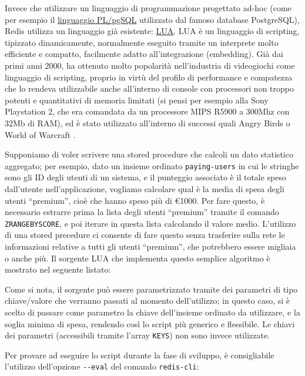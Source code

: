 Invece che utilizzare un linguaggio di programmazione progettato ad-hoc (come per esempio il
\href{https://www.postgresql.org/docs/9.6/static/plpgsql.html}{linguaggio PL/pgSQL} utilizzato dal
famoso database PostgreSQL), Redis utilizza un linguaggio già esistente:
\href{https://www.lua.org}{LUA}. LUA è un linguaggio di scripting, tipizzato dinamicamente,
normalmente eseguito tramite un interprete molto efficiente e compatto, facilmente adatto
all'integrazione (embedding). Già dai primi anni 2000, ha ottenuto molto popolarità nell'industria
di videogiochi come linguaggio di scripting, proprio in virtù del profilo di performance e
compatezza che lo rendeva utilizzabile anche all'interno di console con processori non troppo
potenti e quantitativi di memoria limitati (si pensi per esempio alla Sony Playstation 2, che era
comandata da un processore MIPS R5900 a 300Mhz con 32Mb di RAM), ed è stato utilizzato all'interno
di successi quali Angry Birds \cite{lua-angry} o World of Warcraft \cite{lua-wow}.

Supponiamo di voler scrivere una stored procedure che calcoli un dato statistico aggregato; per
esempio, dato un insieme ordinato \verb|paying-users| in cui le stringhe sono gli ID degli utenti
di un sistema, e il punteggio associato è il totale speso dall'utente nell'applicazione, vogliamo
calcolare qual è la media di spesa degli utenti ``premium'', cioè che hanno speso più di €1000. 
Per fare questo, è necessario estrarre prima la lista degli utenti ``premium'' tramite il comando
\verb|ZRANGEBYSCORE|, e poi iterare in questa lista calcolando il valore medio. L'utilizzo di una
stored precedure ci consente di fare questo senza trasferire sulla rete le informazioni relative
a tutti gli utenti ``premium'', che potrebbero essere migliaia o anche più. Il sorgente LUA che
implementa questo semplice algoritmo è mostrato nel seguente listato:

\medskip


Come si nota, il sorgente può essere parametrizzato tramite dei parametri di tipo chiave/valore
che verranno passati al momento dell'utilizzo; in questo caso, si è scelto di passare come parametro 
la chiave dell'insieme ordinato da utilizzare, e la soglia minima di spesa, rendendo così lo script 
più generico e flessibile. Le chiavi dei parametri (accessibili tramite l'array \verb|KEYS|) non
sono invece utilizzate.

Per provare ad eseguire lo script durante la fase di sviluppo, è consigliabile l'utilizzo
dell'opzione \verb|--eval| del comando \verb|redis-cli|:

